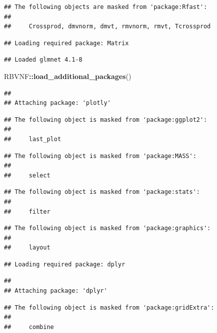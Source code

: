 \documentclass[
]{article}
\newenvironment{Shaded}{\begin{snugshade}}{\end{snugshade}}
\newcommand{\FunctionTok}[1]{\textcolor[rgb]{0.13,0.29,0.53}{\textbf{#1}}}
\newcommand{\NormalTok}[1]{#1}
\newcommand{\SpecialCharTok}[1]{\textcolor[rgb]{0.81,0.36,0.00}{\textbf{#1}}}
\begin{document}
\begin{verbatim}
## The following objects are masked from 'package:Rfast':
## 
##     Crossprod, dmvnorm, dmvt, rmvnorm, rmvt, Tcrossprod
\end{verbatim}

\begin{verbatim}
## Loading required package: Matrix
\end{verbatim}

\begin{verbatim}
## Loaded glmnet 4.1-8
\end{verbatim}

\begin{Shaded}
\begin{Highlighting}[]
\NormalTok{RBVNF}\SpecialCharTok{::}\FunctionTok{load\_additional\_packages}\NormalTok{()}
\end{Highlighting}
\end{Shaded}

\begin{verbatim}
## 
## Attaching package: 'plotly'
\end{verbatim}

\begin{verbatim}
## The following object is masked from 'package:ggplot2':
## 
##     last_plot
\end{verbatim}

\begin{verbatim}
## The following object is masked from 'package:MASS':
## 
##     select
\end{verbatim}

\begin{verbatim}
## The following object is masked from 'package:stats':
## 
##     filter
\end{verbatim}

\begin{verbatim}
## The following object is masked from 'package:graphics':
## 
##     layout
\end{verbatim}

\begin{verbatim}
## Loading required package: dplyr
\end{verbatim}

\begin{verbatim}
## 
## Attaching package: 'dplyr'
\end{verbatim}

\begin{verbatim}
## The following object is masked from 'package:gridExtra':
## 
##     combine
\end{verbatim}
\end{document}
